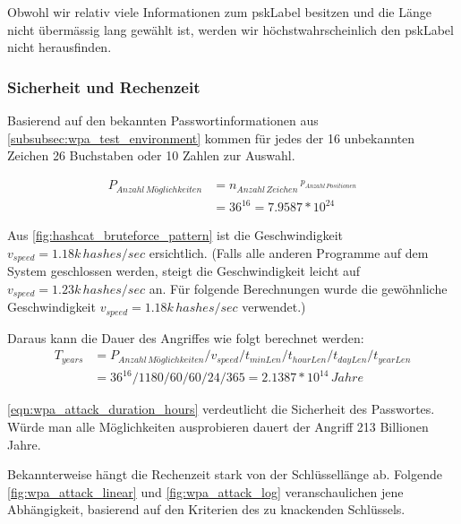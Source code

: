 Obwohl wir relativ viele Informationen zum \gls{pskLabel} besitzen und die Länge nicht übermässig lang gewählt ist, werden wir höchstwahrscheinlich den \gls{pskLabel} nicht herausfinden.


\subsubsection{Sicherheit und Rechenzeit}

Basierend auf den bekannten Passwortinformationen aus \cref{subsubsec:wpa_test_environment} kommen für jedes der 16 unbekannten Zeichen 26 Buchstaben oder 10 Zahlen zur Auswahl.

\begin{equation}
	\begin{split}
	\label{eqn:wpa_attack_key_possibelities}
	P_{Anzahl\,Möglichkeiten} &= n_{Anzahl\,Zeichen}\,^{p_{Anzahl\,Positionen}}\\
	&= 36^{16} = 7.9587 * 10^{24}
	\end{split}
\end{equation}

Aus \cref{fig:hashcat_bruteforce_pattern} ist die Geschwindigkeit $v_{speed} = 1.18k\,hashes/sec$ ersichtlich.
(Falls alle anderen Programme auf dem System geschlossen werden, steigt die Geschwindigkeit leicht auf $v_{speed} = 1.23k\,hashes/sec$ an.
Für folgende Berechnungen wurde die gewöhnliche Geschwindigkeit $v_{speed} = 1.18k\,hashes/sec$ verwendet.)

Daraus kann die Dauer des Angriffes wie folgt berechnet werden:
\begin{equation}
	\begin{split}
	\label{eqn:wpa_attack_duration_hours}
	T_{years} &= P_{Anzahl\,Möglichkeiten} / v_{speed} / t_{minLen} / t_{hourLen} / t_{dayLen} / t_{yearLen}\\
	&= 36^{16} / 1180 / 60 / 60 / 24 / 365 = 2.1387 * 10^{14}\,Jahre
	\end{split}
\end{equation}

\cref{eqn:wpa_attack_duration_hours} verdeutlicht die Sicherheit des Passwortes. Würde man alle Möglichkeiten ausprobieren dauert der Angriff 213 Billionen Jahre.

Bekannterweise hängt die Rechenzeit stark von der Schlüssellänge ab.
Folgende \cref{fig:wpa_attack_linear} und \cref{fig:wpa_attack_log} veranschaulichen jene Abhängigkeit, basierend auf den Kriterien des zu knackenden Schlüssels.

